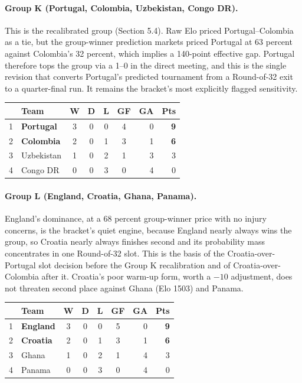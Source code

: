 \documentclass[11pt,letterpaper]{article}
\begin{document}
\paragraph{Group K (Portugal, Colombia, Uzbekistan, Congo DR).} This is the recalibrated group (Section 5.4). Raw Elo priced Portugal--Colombia as a tie, but the group-winner prediction markets priced Portugal at 63 percent against Colombia's 32 percent, which implies a 140-point effective gap. Portugal therefore tops the group via a 1--0 in the direct meeting, and this is the single revision that converts Portugal's predicted tournament from a Round-of-32 exit to a quarter-final run. It remains the bracket's most explicitly flagged sensitivity.
\smallskip{}\\[1pt]
{\footnotesize
\begin{tabular}{@{}clccccrr@{}}
\toprule
 & Team & W & D & L & GF & GA & Pts \\
\midrule
1 & \textbf{Portugal} & 3 & 0 & 0 & 4 & 0 & \textbf{9} \\
2 & \textbf{Colombia} & 2 & 0 & 1 & 3 & 1 & \textbf{6} \\
3 & Uzbekistan & 1 & 0 & 2 & 1 & 3 & 3 \\
4 & Congo DR & 0 & 0 & 3 & 0 & 4 & 0 \\
\bottomrule
\end{tabular}}\smallskip

\paragraph{Group L (England, Croatia, Ghana, Panama).} England's dominance, at a 68 percent group-winner price with no injury concerns, is the bracket's quiet engine, because England nearly always wins the group, so Croatia nearly always finishes second and its probability mass concentrates in one Round-of-32 slot. This is the basis of the Croatia-over-Portugal slot decision before the Group K recalibration and of Croatia-over-Colombia after it. Croatia's poor warm-up form, worth a $-10$ adjustment, does not threaten second place against Ghana (Elo 1503) and Panama.
\smallskip{}\\[1pt]
{\footnotesize
\begin{tabular}{@{}clccccrr@{}}
\toprule
 & Team & W & D & L & GF & GA & Pts \\
\midrule
1 & \textbf{England} & 3 & 0 & 0 & 5 & 0 & \textbf{9} \\
2 & \textbf{Croatia} & 2 & 0 & 1 & 3 & 1 & \textbf{6} \\
3 & Ghana & 1 & 0 & 2 & 1 & 4 & 3 \\
4 & Panama & 0 & 0 & 3 & 0 & 4 & 0 \\
\bottomrule
\end{tabular}}\smallskip
\end{document}
